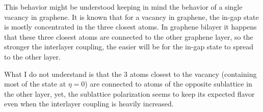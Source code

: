 \documentclass[a4paper]{article}
\begin{document}
This behavior might be understood keeping in mind the behavior of a single vacancy in graphene. It is known that for a vacancy in graphene, the in-gap state is mostly concentrated in the three closest atoms. In graphene bilayer it happens that these three closest atoms are connected to the other graphene layer, so the stronger the interlayer coupling, the easier will be for the in-gap state to spread to the other layer.

What I do not understand is that the 3 atoms closest to the vacancy (containing most of the state at $\eta=0$) are connected to atoms of the opposite sublattice in the other layer, yet, the sublattice polarization seems to keep its expected flavor even when the interlayer coupling is heavily increased.
\end{document}
